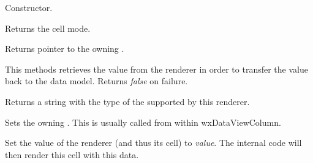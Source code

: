 




\label{wxdataviewrendererwxdataviewrenderer}


Constructor.

\label{wxdataviewrenderergetmode}


Returns the cell mode.

\label{wxdataviewrenderergetowner}


Returns pointer to the owning .

\label{wxdataviewrenderergetvalue}


This methods retrieves the value from the renderer in order to
transfer the value back to the data model. Returns {\it false}
on failure.

\label{wxdataviewrenderergetvarianttype}


Returns a string with the type of the 
supported by this renderer.

\label{wxdataviewrenderersetowner}


Sets the owning . This
is usually called from within wxDataViewColumn.

\label{wxdataviewrenderersetvalue}


Set the value of the renderer (and thus its cell) to {\it value}.
The internal code will then render this cell with this data.


